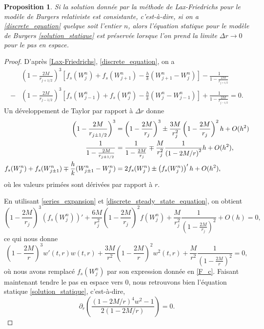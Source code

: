 \documentclass[11pt,a4paper]{article}
\newtheorem{proposition}[theorem]{Proposition}
\begin{document}
\begin{proposition}
Si la solution donnée par la méthode de Lax-Friedrichs pour le modèle de Burgers relativiste est consistante, c'est-à-dire, si on a \eqref{discrete_equation} quelque soit l'entier $n$, alors l'équation statique pour le modèle de Burgers \eqref{solution_statique} est préservée lorsque l'on prend la limite $\Delta r \to 0$ pour le pas en espace. 
\end{proposition}
\begin{proof}

D'après \eqref{Lax-Friedrichs}, \eqref{discrete_equation}, on a
\begin{align}\label{discrete_steady_state_equation}
	&\left(
    		1-\frac{2M}{r_{j+1/2}}
    	\right)^3
    	\left[
    		f_s(W_j^n)+f_s(W_{j+1}^n)
        -\frac{h}{k}(W_{j+1}^n-W_j^n)
   	\right]
    -\frac{1}{1-\frac{2M}{r_{j+1/2}}}
    \\
    -&\left(
    		1-\frac{2M}{r_{j-1/2}}
     \right)^3
     \left[
     	f_s(W_{j-1}^n) + f_s(W_{j}^n)
        -\frac{h}{k}(W_{j}^n-W_{j-1}^n)
     \right]
     +\frac{1}{1-\frac{2M}{r_{j-1/2}}}
     = 0 \nonumber. 
\end{align}
Un développement de Taylor par rapport à $\Delta r$ donne 
\begin{equation}\label{series_expansion}
\aligned 
	\left(
    		1-\frac{2M}{r_{j \pm 1/2}}
    	\right)^3
    &=
    	\left(
    		1-\frac{2M}{r_j}
    	\right)^3 
    	\pm
    	\frac{3M}{r_j^2}\left(
    						1-\frac{2M}{r_j}
    					\right)^2 h + O(h^2)
    	\\
    	\frac{1}{1-\frac{2M}{r_{j \pm 1/2}}}
    &=
    	\frac{1}{1-\frac{2M}{r_j}}
    	\mp
    	\frac{M}{r_j^2}\frac{1}{\left(1-2M/ r\right)^2}h + O(h^2), 
    	\\
    f_s(W_j^n) + f_s(W_{j \pm 1}^n) \mp \frac{h}{k}(W_{j \pm 1}^n-W_j^n)
    &=
    	2f_s(W_j^n) \pm \left(
                  	  f_s(W_j^n)
                  \right)'h + O(h^2), 
\endaligned 
\end{equation}
 où les valeurs primées sont dérivées par rapport à $r$.
  
 En utilisant \eqref{series_expansion} et \eqref{discrete_steady_state_equation}, on obtient
 \[
	  \left(
    	  	  1-\frac{2M}{r_j}
    	  \right)^3
    	  \left(
          f_s(W_j^n)
      \right)'
    + \frac{6M}{r_j^2} \left(
    						1-\frac{2M}{r_j}
    					   \right)^2 f(W_j^n)
    	+ \frac{M}{r_j^2} \frac{1}{\left(1-\frac{2M}{r_j}\right)^2}
    	+ O(h)
    	= 0, 
\] 
 ce qui nous donne
\begin{equation}\label{Consistency_equation}
	  \left(
    		  1-\frac{2M}{r}
    	  \right)^3 w'(t,r)w(t,r)
    	+ \frac{3M}{r^2}\left(
    						1-\frac{2M}{r}
    					\right)^2 w^2(t,r)
    	+ \frac{M}{r^2} \frac{1}{\left(1-\frac{2M}{r}\right)^2}
    	=0, 
\end{equation} 
où nous avons remplacé $f_s(W_j^n)$ par son expression donnée en \eqref{F_c}. Faisant maintenant tendre le pas en espace vers $0$, nous retrouvons bien l'équation statique \eqref{solution_statique}, c'est-à-dire, 
\[ 
\partial_r\left(\frac{\left(1-2M/r\right)^4w^2 - 1}{2\left(1-2M/ r\right)}\right) = 0. 
\]
\end{proof}
\end{document}
